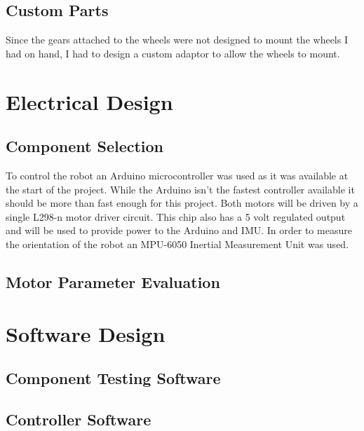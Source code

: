 \documentclass{article}
\begin{document}
		
	\subsection{Custom Parts}
	Since the gears attached to the wheels were not designed to mount the wheels I had on hand, I had to design a custom adaptor to allow the wheels to mount. 

\section{Electrical Design}
	\subsection{Component Selection}
	To control the robot an Arduino microcontroller was used as it was available at the start of the project. While the Arduino isn't the fastest controller available it should be more than fast enough for this project.
	Both motors will be driven by a single L298-n motor driver circuit. This chip also has a 5 volt regulated output and will be used to provide power to the Arduino and IMU. 
	In order to measure the orientation of the robot an MPU-6050 Inertial Measurement Unit was used.
	
	
	\subsection{Motor Parameter Evaluation}
	
	
	

\section{Software Design}
	\subsection{Component Testing Software}
	
	\subsection{Controller Software}
	
\end{document}
